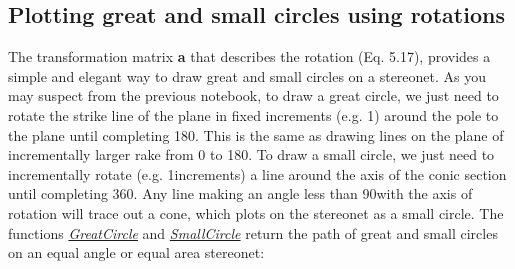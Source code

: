 \documentclass[a4paper , 12pt]{book}
\begin{document}
\subsection{Plotting great and small circles using rotations}

The transformation matrix \textbf{a} that describes the rotation (Eq. 5.17), provides a simple and elegant way to draw great and small circles on a stereonet. As you may suspect from the previous notebook, to draw a great circle, we just need to rotate the strike line of the plane in fixed increments (e.g. 1\degree) around the pole to the plane until completing 180\degree. This is the same as drawing lines on the plane of incrementally larger rake from 0 to 180\degree. To draw a small circle, we just need to incrementally rotate (e.g. 1\degree increments) a line around the axis of the conic section until completing 360\degree. Any line making an angle less than 90\degree with the axis of rotation will trace out a cone, which plots on the stereonet as a small circle. The functions \href{https://github.com/nfcd/compGeo/blob/master/source/functions/GreatCircle.py}{\textit{GreatCircle}} and \href{https://github.com/nfcd/compGeo/blob/master/source/functions/SmallCircle.py}{\textit{SmallCircle}} return the path of great and small circles on an equal angle or equal area stereonet:
\end{document}
